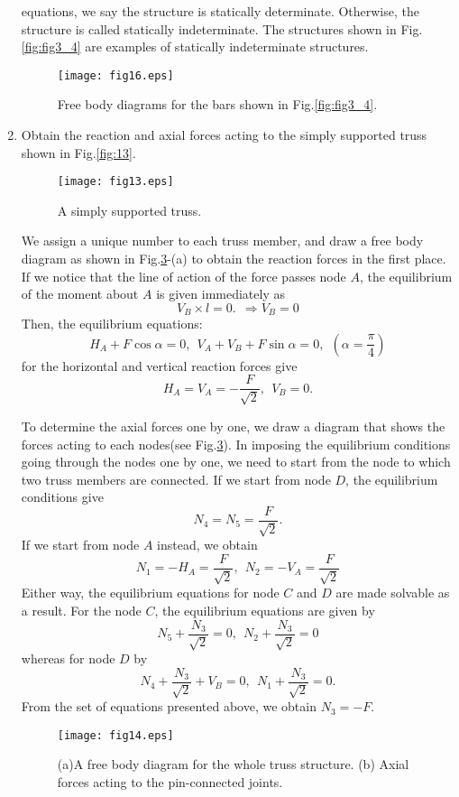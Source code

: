 ﻿\documentclass[10pt,a4j]{article}
\begin{document}
\begin{enumerate}
{	equations, we say the structure is statically determinate. Otherwise, the structure 
	is called statically indeterminate. The structures shown in Fig.\ref{fig:fig3_4} are 
	 examples of statically indeterminate structures.
}
\begin{figure}[h]
	\begin{center}
	\texttt{[image: fig16.eps]} 
	\end{center}
	\caption{Free body diagrams for the bars shown in Fig.\ref{fig:fig3_4}.} 
	\label{fig:fig16}
\end{figure}
\item
	Obtain the reaction and axial forces acting to the simply supported truss 
	shown in Fig.\ref{fig:13}.
\begin{figure}[h]
	\begin{center}
	\texttt{[image: fig13.eps]} 
	\end{center}
	\caption{A simply supported truss. } 
	\label{fig:fig13}
\end{figure}
{\small 
	We assign a unique number to each truss member, and draw a free body diagram 
	as shown in Fig.\ref{fig:fig14}-(a) to obtain the reaction forces in the first place. 
	If we notice that the line of action of the force passes node $A$, the equilibrium 
	of the moment about $A$ is given immediately as  
	\[
		V_B\times l =0. \ \ \Rightarrow V_B=0
	\]
	Then, the equilibrium equations: 
	\[ 
		H_A+F\cos\alpha =0 , \ \ V_A+V_B+F\sin\alpha=0, \ \ \left( \alpha=\frac{\pi}{4}\right)
	\]
	for the horizontal and vertical reaction forces give
	\[
		H_A=V_A=-\frac{F}{\sqrt{2}}, \ \ V_B=0.
	\]

	To determine the axial forces one by one, we draw a diagram 
	that shows the forces acting to each nodes(see Fig.\ref{fig:fig14}). 
	In imposing the equilibrium conditions going through the nodes one by one, 
	we need to start from the node to which two truss members are connected.
	If we start from node $D$, the equilibrium conditions give
	\[ 
		N_4=N_5=\frac{F}{\sqrt{2}}.
	\]
	If we start from node $A$ instead, we obtain
	\[
		N_1=-H_A=\frac{F}{\sqrt{2}}, \ \ 
		N_2=-V_A=\frac{F}{\sqrt{2}}
	\]
	Either way, the equilibrium equations for node $C$ and $D$ are made 
	solvable as a result.
	For the node $C$, the equilibrium equations are given by 
	\[
		N_5+\frac{N_3}{\sqrt{2}}=0, \ \ 
		N_2+\frac{N_3}{\sqrt{2}}=0
	\]
	whereas for node $D$ by
	\[
		N_4+\frac{N_3}{\sqrt{2}}+V_B=0, \ \ 
		N_1+\frac{N_3}{\sqrt{2}}=0.
	\]
	From the set of equations presented above, we obtain $N_3=-F$.
}
\begin{figure}[h]
	\begin{center}
	\texttt{[image: fig14.eps]} 
	\end{center}
	\caption{(a)A free body diagram for the whole truss structure.
	(b) Axial forces acting to the pin-connected joints.} 
	\label{fig:fig14}
\end{figure}
\end{enumerate}
\end{document}
